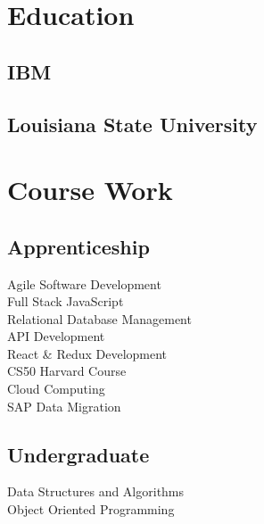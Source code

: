 \documentclass[]{deedy-resume-openfont}
\begin{document}
\begin{minipage}[t]{0.33\textwidth}

\section{Education} 

\subsection{IBM}
\sectionsep

\subsection{Louisiana State University}
\sectionsep
\section{Course Work}

\subsection{Apprenticeship}
Agile Software Development  \\
Full Stack JavaScript \\
Relational Database Management \\
API Development \\
React & Redux Development \\
CS50 Harvard Course \\
Cloud Computing \\
SAP Data Migration \\
\vspace{\topsep} %
\subsection{Undergraduate}
Data Structures and Algorithms \\
Object Oriented Programming  \\

%
%

\end{minipage} 
\end{document}
